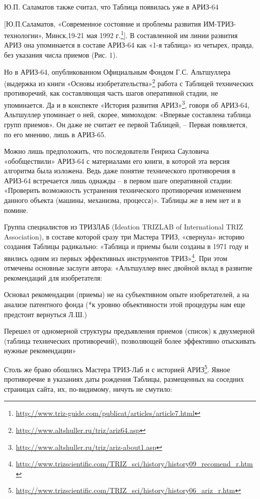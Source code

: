 \documentclass[11pt,a4paper]{article}
\begin{document}
Ю.П. Саламатов также считал, что Таблица появилась уже в АРИЗ-64

[Ю.П.Саламатов, «Современное состояние и проблемы развития
  ИМ-ТРИЗ-технологии», Минск,19-21 мая 1992
  г.\footnote{\url{http://www.triz-guide.com/publicat/articles/article7.html}}].
В составленной им линии развития АРИЗ она упоминается в составе АРИЗ-64 как
«1-я таблица» из четырех, правда, без указания числа приемов (Рис. 1).

Но в АРИЗ-64, опубликованном Официальным Фондом Г.С. Альтшуллера (выдержка из
книги «Основы
изобретательства»\footnote{\url{http://www.altshuller.ru/triz/ariz64.asp}}
работа с Таблицей технических противоречий, как составляющая часть шагов
оперативной стадии, не упоминается.  Да и в конспекте «История развития
АРИЗ»\footnote{\url{http://www.altshuller.ru/triz/ariz-about1.asp}}, говоря об
АРИЗ-64, Альтшуллер упоминает о ней, скорее, мимоходом: «Впервые составлена
таблица групп приемов». Он даже не считает ее первой Таблицей, -- Первая
появляется, по его мнению, лишь в АРИЗ-65.

Можно лишь предположить, что последователи Генриха Сауловича «обобществили»
АРИЗ-64 с материалами его книги, в которой эта версия алгоритма была
изложена. Ведь даже понятие технического противоречия в АРИЗ-64 встречается
лишь однажды -- в первом шаге оперативной стадии: «Проверить возможность
устранения технического противоречия изменением данного объекта (машины,
механизма, процесса)». Таблицы же в нем нет и в помине.

Группа специалистов из ТРИЗЛАБ (Ideation TRIZLAB of International TRIZ
Association), в составе которой сразу три Мастера ТРИЗ, «свернула» историю
создания Таблицы радикально: «Таблица и приемы были созданы в 1971 году и
явились одним из первых эффективных инструментов
ТРИЗ»\footnote{\url{http://www.trizscientific.com/TRIZ_sci/history/history09_recomend_r.htm}}.
При этом отмечены основные заслуги автора: «Альтшуллер внес двойной вклад в
развитие рекомендаций для изобретателя:

Основал рекомендации (приемы) не на субъективном опыте изобретателей, а на
анализе патентного фонда (*к уровню объективности этой процедуры нам еще
предстоит вернуться Л.Ш.)

Перешел от одномерной структуры предъявления приемов (список) к двухмерной
(таблица технических противоречий), позволяющей более эффективно отыскивать
нужные рекомендации»

Столь же браво обошлись Мастера ТРИЗ-Лаб и с историей
АРИЗ\footnote{\url{http://www.trizscientific.com/TRIZ_sci/history/history06_ariz_r.htm}}.
Явное противоречие в указаниях даты рождения Таблицы, размещенных на соседних
страницах сайта, их, по-видимому, ничуть не смутило:
\end{document}
